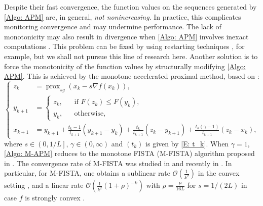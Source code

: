 \documentclass[pdflatex,sn-mathphys-num]{sn-jnl}
\theoremstyle{thmstyleone}
\theoremstyle{thmstyletwo}
\theoremstyle{thmstylethree}
\DeclareMathOperator{\prox}{prox}
\begin{document}
Despite their fast convergence, the function values on the sequences generated by \eqref{Algo: APM} are, in general, {\it not nonincreasing}. In practice, this complicates monitoring convergence and may undermine performance. The lack of monotonicity may also result in divergence when \eqref{Algo: APM} involves inexact computations  \cite[Section V.A]{Beck_2009_Monotone}. This problem can be fixed by using restarting techniques \cite{Boyd_2014,Candes_2015,Alamo_2023,Juan_2023,Aujol_2024}, for example, but we shall not pursue this line of research here. Another solution is to force the monotonicity of the function values by structurally modifying \eqref{Algo: APM}. This is achieved by the monotone accelerated proximal method, based on \cite{Beck_2009_Monotone}:
\begin{equation}\label{Algo: M-APM}\tag{M-APM}
\left\{
\begin{aligned}
z_k &= \prox_{sg}\left( x_k - s\nabla f(x_k) \right),\\
y_{k+1} &= \left\{
\begin{array}{ccl}
z_k,&&\text{if  }F(z_k)\le F(y_k),\\[3pt]
y_k,&&\text{otherwise},
\end{array}
\right.\\
x_{k+1} &= y_{k+1} + \frac{t_k-1}{t_{k+1}}(y_{k+1}-y_k) 
           + \frac{t_k}{t_{k+1}}(z_k-y_{k+1})
           + \frac{t_k(\gamma-1)}{t_{k+1}}(z_k-x_k),
\end{aligned}
\right.
\end{equation}
where $s\in \left( 0, 1/L \right]$, $\gamma\in(0,\infty)$ and $(t_k)$ is given by \eqref{E: t_k}. When $\gamma=1$, \eqref{Algo: M-APM} reduces to the monotone FISTA (M-FISTA) algorithm proposed in \cite{Beck_2009_Monotone}. The convergence rate of M-FISTA was studied in \cite{Beck_2009_Monotone} and recently in \cite{Shi_2024_Monotone}. In particular, for M-FISTA, one obtains a sublinear rate $\mathcal{O}\left( \frac{1}{k^2} \right)$ in the convex setting \cite{Beck_2009_Monotone}, and a linear rate $\mathcal{O}\left( \frac{1}{k^2}(1 + \rho)^{-k}\right)$ with $\rho=\frac{\mu}{16L}$ for $s=1/(2L)$ in case $f$ is strongly convex \cite{Shi_2024_Monotone}. 
\end{document}

